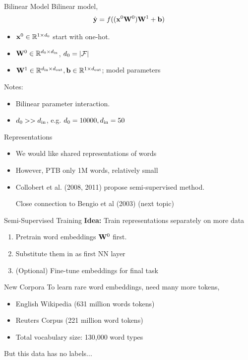 \documentclass{beamer}
\begin{document}
\begin{frame}{Bilinear Model}
  Bilinear model,
  \[\hat{\mathbf{y}} = f((\mathbf{x}^0 \mathbf{W}^0)\mathbf{W}^1 + \mathbf{b})\]
  \begin{itemize}
  \item $\mathbf{x}^0 \in \mathbb{R}^{1 \times d_0}$ start with one-hot.
  \item $\mathbf{W}^0 \in \mathbb{R}^{d_0 \times {d_{\mathrm{in}}}}$, $d_0 = |\mathcal{F}|$
  \item $\mathbf{W}^1 \in \mathbb{R}^{{d_{\mathrm{in}}} \times {d_{\mathrm{out}}}}, \mathbf{b} \in \mathbb{R}^{1 \times {d_{\mathrm{out}}}}$; model parameters
  \end{itemize}
  \air
  Notes:
  \begin{itemize}
  \item Bilinear parameter interaction.
  \item $d_0 >> {d_{\mathrm{in}}}$, e.g. $d_0 = 10000, {d_{\mathrm{in}}} = 50$
  \end{itemize}
\end{frame}

\begin{frame}{Representations}
  \begin{itemize}
  \item We would like shared representations of words
    \air 

  \item However, PTB only 1M words, relatively small

    \air
  \item Collobert et al. (2008, 2011) propose semi-supervised method.

    \air
  \item [Close connection to Bengio et al (2003) (next topic)]
  \end{itemize}
\end{frame}

\begin{frame}{Semi-Supervised Training }
  \textbf{Idea:} Train representations separately on more data

  \begin{enumerate}
  \item Pretrain word embeddings $\mathbf{W}^0$ first.
  \item Substitute them in as first NN layer
  \item (Optional) Fine-tune embeddings for final task
  \end{enumerate}
\end{frame}

\begin{frame}{New Corpora}
  To learn rare word embeddings, need many more tokens,

  \begin{itemize}
  \item English Wikipedia (631 million words tokens)
    \air 
  \item Reuters Corpus (221 million word tokens)
    \air 
  \item Total vocabulary size: 130,000 word types 
  \end{itemize}

  But this data has no labels...
\end{frame}
\end{document}
